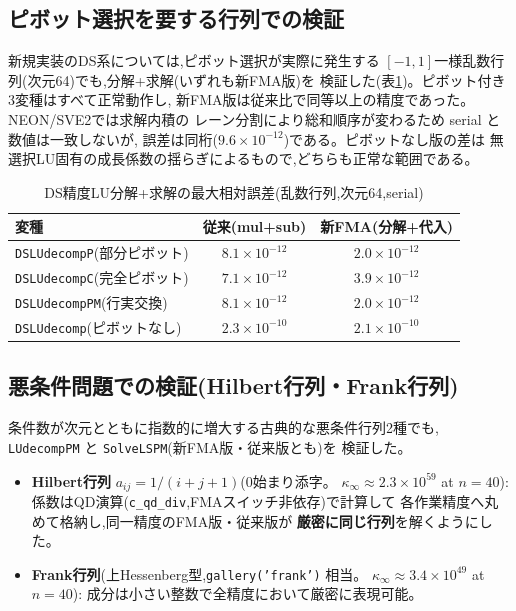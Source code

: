 \documentclass[a4j,dvipdfmx,11pt]{jsarticle}
\begin{document}
\subsection{ピボット選択を要する行列での検証}

新規実装のDS系については,ピボット選択が実際に発生する
$[-1,1]$一様乱数行列(次元64)でも,分解+求解(いずれも新FMA版)を
検証した(表\ref{tab:dspivot})。ピボット付き3変種はすべて正常動作し,
新FMA版は従来比で同等以上の精度であった。NEON/SVE2では求解内積の
レーン分割により総和順序が変わるため serial と数値は一致しないが,
誤差は同桁($9.6\times10^{-12}$)である。ピボットなし版の差は
無選択LU固有の成長係数の揺らぎによるもので,どちらも正常な範囲である。

\begin{table}[htbp]
\centering
\caption{DS精度LU分解+求解の最大相対誤差(乱数行列,次元64,serial)}
\label{tab:dspivot}
\begin{tabular}{lcc}
\toprule
変種 & 従来(mul+sub) & 新FMA(分解+代入) \\
\midrule
\texttt{DSLUdecompP}(部分ピボット) & $8.1\times10^{-12}$ & $2.0\times10^{-12}$ \\
\texttt{DSLUdecompC}(完全ピボット) & $7.1\times10^{-12}$ & $3.9\times10^{-12}$ \\
\texttt{DSLUdecompPM}(行実交換) & $8.1\times10^{-12}$ & $2.0\times10^{-12}$ \\
\texttt{DSLUdecomp}(ピボットなし) & $2.3\times10^{-10}$ & $2.1\times10^{-10}$ \\
\bottomrule
\end{tabular}
\end{table}

\subsection{悪条件問題での検証(Hilbert行列・Frank行列)}
\label{sec:illcond}

条件数が次元とともに指数的に増大する古典的な悪条件行列2種でも,
\texttt{LUdecompPM} と \texttt{SolveLSPM}(新FMA版・従来版とも)を
検証した。

\begin{itemize}
  \item \textbf{Hilbert行列} $a_{ij} = 1/(i+j+1)$($0$始まり添字。
        $\kappa_\infty \approx 2.3\times10^{59}$ at $n=40$):
        係数はQD演算(\texttt{c\_qd\_div},FMAスイッチ非依存)で計算して
        各作業精度へ丸めて格納し,同一精度のFMA版・従来版が
        \textbf{厳密に同じ行列}を解くようにした。
  \item \textbf{Frank行列}(上Hessenberg型,\texttt{gallery('frank')} 相当。
        $\kappa_\infty \approx 3.4\times10^{49}$ at $n=40$):
        成分は小さい整数で全精度において厳密に表現可能。
\end{itemize}
\end{document}
